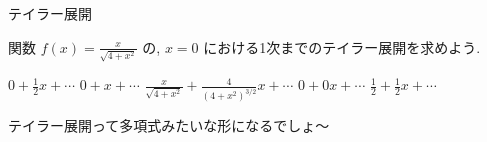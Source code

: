 \makeatletter  
{}%
\makeatother

\begin{theme}{テイラー展開}
  \begin{memo}
  \end{memo}
  \begin{prob}
    関数 $f(x)=\frac{x}{\sqrt{4+x^2}}$ の, 
    $x=0$ における1次までのテイラー展開を求めよう.
    \begin{enumerate}
      \itemtrue $0+\frac{1}{2}x+\cdots$
      \itemfalse $0+x+\cdots$
      \itemfalse $\frac{x}{\sqrt{4+x^2}}+\frac{4}{(4+x^2)^{3/2}}x+\cdots$
      \itemfalse $0+0x+\cdots$
      \itemfalse $\frac12+\frac12x+\cdots$
    \end{enumerate}
  \end{prob}

  \begin{sol}
    テイラー展開って多項式みたいな形になるでしょ〜
  \end{sol}
  \begin{answer}
  \end{answer}
\end{theme}

\makeatletter
{}
\makeatother


